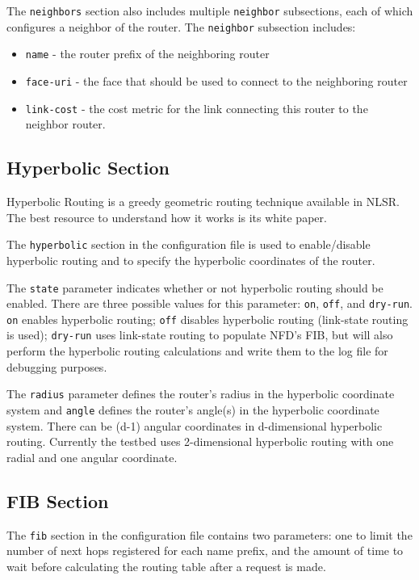 The \texttt{neighbors} section also includes multiple \texttt{neighbor} subsections, each of which configures a neighbor of the router.
The \texttt{neighbor} subsection includes:
\begin{itemize}
\item \texttt{name} - the router prefix of the neighboring router
\item \texttt{face-uri} - the face that should be used to connect to the neighboring router
\item \texttt{link-cost} - the cost metric for the link connecting this router to the neighbor router.
\end{itemize}

\subsection{Hyperbolic Section}

Hyperbolic Routing is a greedy geometric routing technique available in NLSR. The best resource to understand how it works is its white paper. \cite{HyperbolicASF}

The \texttt{hyperbolic} section in the configuration file is used to enable/disable hyperbolic routing and to specify the hyperbolic coordinates of the router.

The \texttt{state} parameter indicates whether or not hyperbolic routing should be enabled. There are three possible values for this parameter: \texttt{on}, \texttt{off}, and \texttt{dry-run}. \texttt{on} enables hyperbolic routing; \texttt{off} disables hyperbolic routing (link-state routing is used); \texttt{dry-run} uses link-state routing to populate NFD's FIB, but will also perform the hyperbolic routing calculations and write them to the log file for debugging purposes.

The \texttt{radius} parameter defines the router's radius in the hyperbolic coordinate system and \texttt{angle} defines the router's angle(s) in the hyperbolic coordinate system. There can be (d-1) angular coordinates in d-dimensional hyperbolic routing. Currently the testbed uses 2-dimensional hyperbolic routing with one radial and one angular coordinate.

\subsection{FIB Section}

The \texttt{fib} section in the configuration file contains two parameters: one to limit the number of next hops registered for each name prefix, and the amount of time to wait before calculating the routing table after a request is made.


